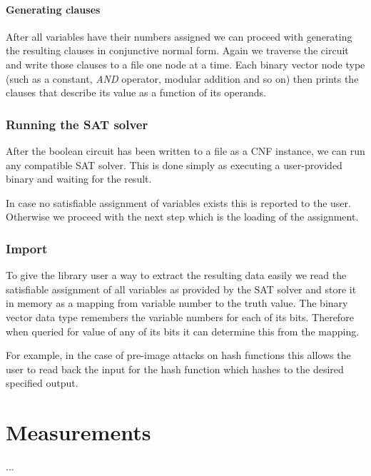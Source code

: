 \subsubsection{Generating clauses}
After all variables have their numbers assigned we can proceed with generating the resulting clauses in conjunctive normal form.
Again we traverse the circuit and write those clauses to a file one node at a time.
Each binary vector node type (such as a constant, \emph{AND} operator, modular addition and so on) then prints the clauses that describe its value as a function of its operands.

\subsection{Running the SAT solver}
After the boolean circuit has been written to a file as a CNF instance, we can run any compatible SAT solver.
This is done simply as executing a user-provided binary and waiting for the result.

In case no satisfiable assignment of variables exists this is reported to the user.
Otherwise we proceed with the next step which is the loading of the assignment.

\subsection{Import}
To give the library user a way to extract the resulting data easily we read the satisfiable assignment of all variables as provided by the SAT solver and store it in memory as a mapping from variable number to the truth value.
The binary vector data type remembers the variable numbers for each of its bits.
Therefore when queried for value of any of its bits it can determine this from the mapping.

For example, in the case of pre-image attacks on hash functions this allows the user to read back the input for the hash function which hashes to the desired specified output.

\chapter{Measurements}

...\\

